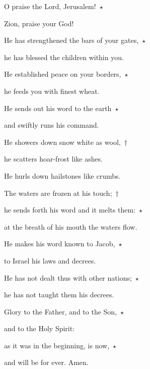 \noindent O praise the Lord, Jerusalem!~$\star$~\nopagebreak

Zion, praise your God!

\noindent He has strengthened the bars of your gates,~$\star$~\nopagebreak

he has blessed the children within you.

\noindent He established peace on your borders,~$\star$~\nopagebreak

he feeds you with finest wheat.

\noindent He sends out his word to the earth~$\star$~\nopagebreak

and swiftly runs his command.

\noindent He showers down snow white as wool,~†~\nopagebreak

he scatters hoar-frost like ashes.

He hurls down hailstones like crumbs.

\noindent The waters are frozen at his touch;~†~\nopagebreak

he sends forth his word and it melts them:~$\star$~\nopagebreak

at the breath of his mouth the waters flow.

\noindent He makes his word known to Jacob,~$\star$~\nopagebreak

to Israel his laws and decrees.

\noindent He has not dealt thus with other nations;~$\star$~\nopagebreak

he has not taught them his decrees.

\noindent Glory to the Father, and to the Son,~$\star$~\nopagebreak

and to the Holy Spirit:

\noindent as it was in the beginning, is now,~$\star$~\nopagebreak

and will be for ever. Amen.
